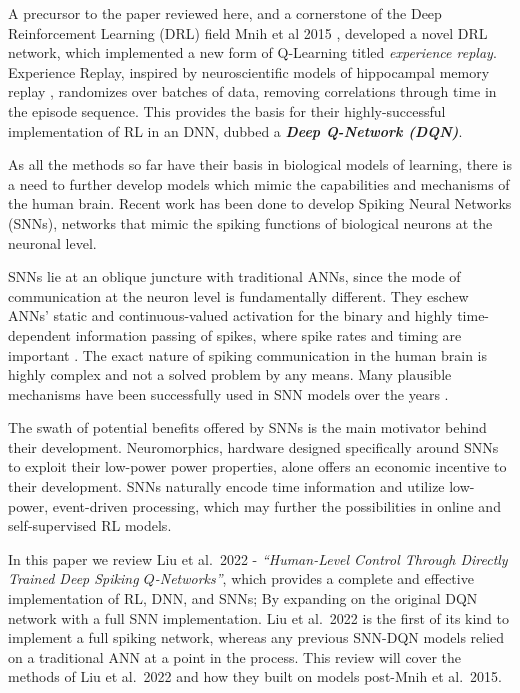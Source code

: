 \documentclass[journal,onecolumn]{IEEEtran}
\begin{document}
A precursor to the paper reviewed here, and a cornerstone of the Deep
Reinforcement Learning (DRL) field Mnih et al 2015
\autocite{mnihHumanlevelControlDeep2015}, developed a novel DRL
network, which implemented a new form of Q-Learning titled
\emph{experience replay}. Experience Replay, inspired by neuroscientific
models of hippocampal memory replay
\autocite{bendorBiasingContentHippocampal2012}
\autocite{oneillPlayItAgain2010}, randomizes over batches of data,
removing correlations through time in the episode sequence. This
provides the basis for their highly-successful implementation of RL in
an DNN, dubbed a \textbf{\emph{Deep Q-Network (DQN)}}.

As all the methods so far have their basis in biological models of
learning, there is a need to further develop models which mimic the
capabilities and mechanisms of the human brain. Recent work has been done to develop Spiking Neural Networks (SNNs), networks that mimic the
spiking functions of biological neurons at the neuronal level.

SNNs lie at an oblique juncture with traditional ANNs, since the mode of
communication at the neuron level is fundamentally different. They
eschew ANNs' static and continuous-valued activation for the binary and
highly time-dependent information passing of spikes, where spike rates
and timing are important
\autocite{tanStrategyBenchmarkConverting2020}. The exact nature
of spiking communication in the human brain is highly complex and not a
solved problem by any means. Many plausible mechanisms have been
successfully used in SNN models over the years
\autocite{vigneronCriticalSurveySTDP2020}.

The swath of potential benefits offered by SNNs is the main motivator
behind their development. Neuromorphics, hardware designed specifically
around SNNs to exploit their low-power power properties, alone offers an
economic incentive to their development. SNNs naturally encode time
information and utilize low-power, event-driven processing, which may
further the possibilities in online and self-supervised RL models.

In this paper we review Liu et al.~2022 - \emph{``Human-Level Control
Through Directly Trained Deep Spiking \(Q\)-Networks''}, which provides
a complete and effective implementation of RL, DNN, and SNNs; By
expanding on the original DQN network
\autocite{mnihHumanlevelControlDeep2015} with a full SNN
implementation. Liu et al.~2022 is the first of its kind to implement a
full spiking network, whereas any previous SNN-DQN models relied on a
traditional ANN at a point in the process. This review will cover the
methods of Liu et al.~2022 and how they built on models post-Mnih et
al.~2015.
\end{document}

